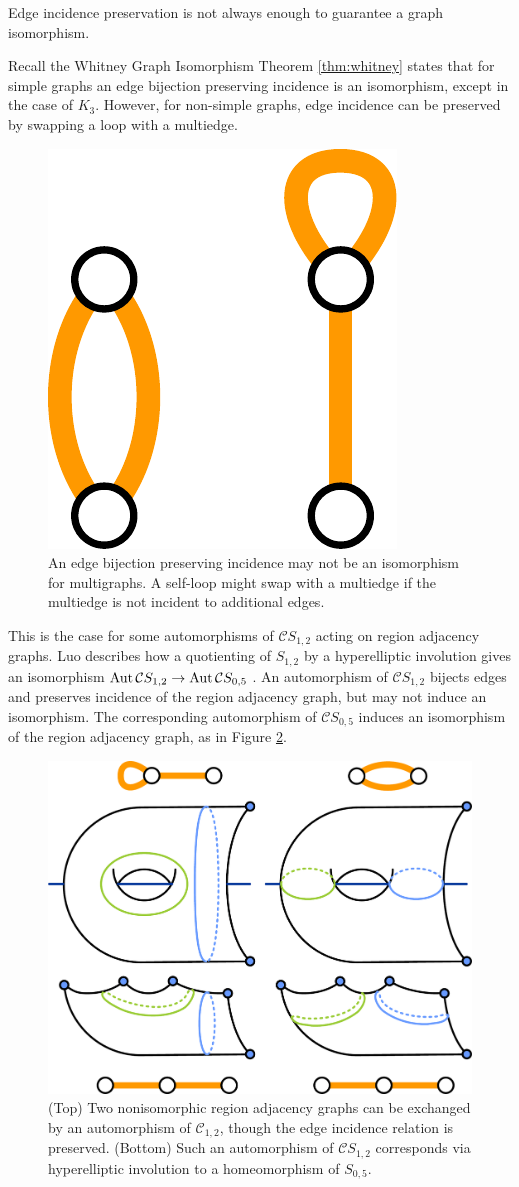 \begin{example}
  Edge incidence preservation is not always enough to guarantee a graph isomorphism.


Recall the Whitney Graph Isomorphism Theorem \ref{thm:whitney}
states that for simple graphs an edge bijection preserving incidence is an isomorphism,
except in the case of $K_3$.
However, for non-simple graphs, edge incidence can be preserved by swapping a loop with a multiedge.
\begin{figure}[h!]
  \centering
  \includegraphics[width=.15\textwidth]{figures/graphexamples2.pdf}
  \caption{An edge bijection preserving incidence may not be an isomorphism for multigraphs.
  A self-loop might swap with a multiedge if the multiedge is not incident to additional edges.}
  \label{fig:looptomultiedge}
\end{figure}
This is the case for some automorphisms  of $\mathcal C S_{1,2}$ acting on region adjacency graphs.
Luo describes how a quotienting of  $S_{1,2}$ by a hyperelliptic involution gives
an isomorphism $\operatorname{Aut} \mathcal C S_{1,2} \to \operatorname{Aut} \mathcal C S_{0,5}$ \cite{MR1722024}.
An automorphism of $\mathcal C S_{1,2}$ bijects edges and preserves incidence of the region adjacency graph, but may not induce an isomorphism. The corresponding automorphism of $\mathcal C S_{0,5}$ induces an
isomorphism of the region adjacency graph, as in Figure \ref{fig:s12ands03}.




\begin{figure}[h!]
  \centering
  \includegraphics[width=.7\textwidth]{figures/s12ands03.pdf}
  \caption{(Top) Two nonisomorphic region adjacency graphs can be exchanged by an automorphism of $\mathcal C_{1,2}$,
  though the edge incidence relation is preserved.
  (Bottom)
  Such an automorphism of $\mathcal C S_{1,2}$ corresponds via hyperelliptic involution to a homeomorphism of $S_{0,5}$.}
  \label{fig:s12ands03}
\end{figure}


\end{example}

